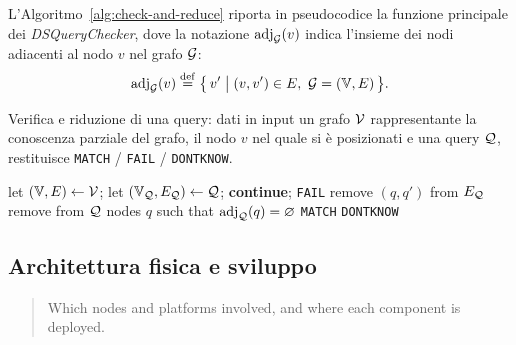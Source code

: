 L'Algoritmo~\ref{alg:check-and-reduce} riporta in pseudocodice
la funzione principale dei \emph{DSQueryChecker}, dove la
notazione $\mathrm{adj}_{\mathcal{G}}(v)$ indica l'insieme dei nodi
adiacenti al nodo $v$ nel grafo $\mathcal{G}$:
\[
\adj{v}{\cG} \defeq \bigl\{\, v' \bigm| (v, v') \in E,
\ \cG = (\Vset, E) \,\bigr\}.
\]

\begin{algorithm}
  \caption{Verifica e riduzione di una query: dati in input
    un grafo $\mathcal{V}$ rappresentante la conoscenza parziale del grafo,
    il nodo $v$ nel quale si è posizionati e
    una query $\mathcal{Q}$, restituisce \texttt{MATCH} / \texttt{FAIL}
    / \texttt{DONTKNOW}.
  }
\label{alg:check-and-reduce}
\begin{algorithmic}[2]
  \State let $(\mathbb{V}, E) \gets \mathcal{V}$;
  \State let $(\mathbb{V}_{\mathcal{Q}}, E_{\mathcal{Q}}) \gets \mathcal{Q}$;
  \State {}
     \textbf{continue}; \EndIf
       \State \Return \texttt{FAIL}
    \EndIf
      \State remove $(q, q')$ from $E_{\mathcal{Q}}$
      \EndIf
    \EndFor
  \EndFor
  \State remove from $\mathcal{Q}$ nodes $q$ such that
  $\mathrm{adj}_{\mathcal{Q}}(q) = \varnothing$
  \If {$\Vset_\cQ = \varnothing$}
    \State \Return \texttt{MATCH}
  \Else
    \State \Return \texttt{DONTKNOW}
  \EndIf
\EndFunction
\end{algorithmic}
\end{algorithm}

\subsection{Architettura fisica e sviluppo}
\label{sec:deploy}
\begin{quote}
Which nodes and platforms involved, and where each
component is deployed.
\end{quote}


